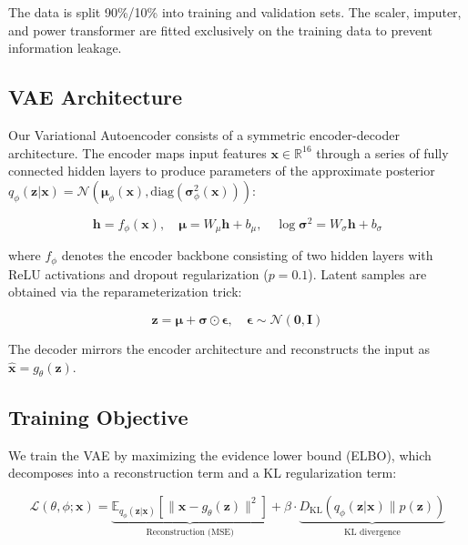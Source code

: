\documentclass[11pt]{article}
\begin{document}
The data is split 90\%/10\% into training and validation sets. The scaler, imputer, and power transformer are fitted exclusively on the training data to prevent information leakage.

\subsection{VAE Architecture}

Our Variational Autoencoder consists of a symmetric encoder-decoder architecture. The encoder maps input features $\mathbf{x} \in \mathbb{R}^{16}$ through a series of fully connected hidden layers to produce parameters of the approximate posterior $q_\phi(\mathbf{z}|\mathbf{x}) = \mathcal{N}(\boldsymbol{\mu}_\phi(\mathbf{x}), \text{diag}(\boldsymbol{\sigma}^2_\phi(\mathbf{x})))$:

\begin{equation}
    \mathbf{h} = f_\phi(\mathbf{x}), \quad \boldsymbol{\mu} = W_\mu \mathbf{h} + b_\mu, \quad \log \boldsymbol{\sigma}^2 = W_\sigma \mathbf{h} + b_\sigma
\end{equation}

where $f_\phi$ denotes the encoder backbone consisting of two hidden layers with ReLU activations and dropout regularization ($p=0.1$). Latent samples are obtained via the reparameterization trick:

\begin{equation}
    \mathbf{z} = \boldsymbol{\mu} + \boldsymbol{\sigma} \odot \boldsymbol{\epsilon}, \quad \boldsymbol{\epsilon} \sim \mathcal{N}(\mathbf{0}, \mathbf{I})
\end{equation}

The decoder mirrors the encoder architecture and reconstructs the input as $\hat{\mathbf{x}} = g_\theta(\mathbf{z})$.

\subsection{Training Objective}

We train the VAE by maximizing the evidence lower bound (ELBO), which decomposes into a reconstruction term and a KL regularization term:

\begin{equation}
    \mathcal{L}(\theta, \phi; \mathbf{x}) = \underbrace{\mathbb{E}_{q_\phi(\mathbf{z}|\mathbf{x})}\left[\| \mathbf{x} - g_\theta(\mathbf{z}) \|^2 \right]}_{\text{Reconstruction (MSE)}} + \beta \cdot \underbrace{D_{\text{KL}}\left(q_\phi(\mathbf{z}|\mathbf{x}) \| p(\mathbf{z})\right)}_{\text{KL divergence}}
\end{equation}
\end{document}
